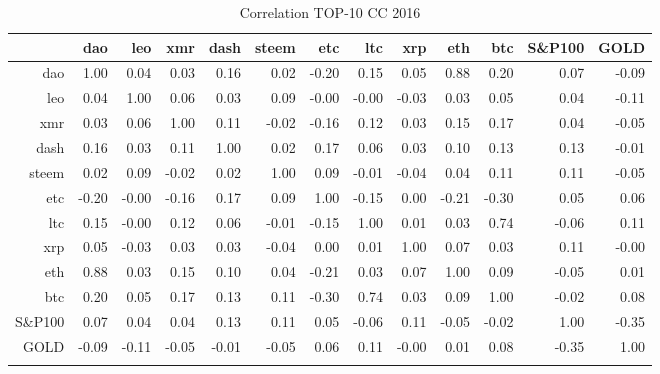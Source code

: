 \begin{table}[ht]
\centering
\begin{tabular}{rrrrrrrrrrrrr}
  \hline
 & dao & leo & xmr & dash & steem & etc & ltc & xrp & eth & btc & S\&P100 & GOLD \\ 
  \hline
dao & 1.00 & 0.04 & 0.03 & 0.16 & 0.02 & -0.20 & 0.15 & 0.05 & 0.88 & 0.20 & 0.07 & -0.09 \\ 
  leo & 0.04 & 1.00 & 0.06 & 0.03 & 0.09 & -0.00 & -0.00 & -0.03 & 0.03 & 0.05 & 0.04 & -0.11 \\ 
  xmr & 0.03 & 0.06 & 1.00 & 0.11 & -0.02 & -0.16 & 0.12 & 0.03 & 0.15 & 0.17 & 0.04 & -0.05 \\ 
  dash & 0.16 & 0.03 & 0.11 & 1.00 & 0.02 & 0.17 & 0.06 & 0.03 & 0.10 & 0.13 & 0.13 & -0.01 \\ 
  steem & 0.02 & 0.09 & -0.02 & 0.02 & 1.00 & 0.09 & -0.01 & -0.04 & 0.04 & 0.11 & 0.11 & -0.05 \\ 
  etc & -0.20 & -0.00 & -0.16 & 0.17 & 0.09 & 1.00 & -0.15 & 0.00 & -0.21 & -0.30 & 0.05 & 0.06 \\ 
  ltc & 0.15 & -0.00 & 0.12 & 0.06 & -0.01 & -0.15 & 1.00 & 0.01 & 0.03 & 0.74 & -0.06 & 0.11 \\ 
  xrp & 0.05 & -0.03 & 0.03 & 0.03 & -0.04 & 0.00 & 0.01 & 1.00 & 0.07 & 0.03 & 0.11 & -0.00 \\ 
  eth & 0.88 & 0.03 & 0.15 & 0.10 & 0.04 & -0.21 & 0.03 & 0.07 & 1.00 & 0.09 & -0.05 & 0.01 \\ 
  btc & 0.20 & 0.05 & 0.17 & 0.13 & 0.11 & -0.30 & 0.74 & 0.03 & 0.09 & 1.00 & -0.02 & 0.08 \\ 
  S\&P100 & 0.07 & 0.04 & 0.04 & 0.13 & 0.11 & 0.05 & -0.06 & 0.11 & -0.05 & -0.02 & 1.00 & -0.35 \\ 
  GOLD & -0.09 & -0.11 & -0.05 & -0.01 & -0.05 & 0.06 & 0.11 & -0.00 & 0.01 & 0.08 & -0.35 & 1.00 \\ 
   \hline
      \caption{Correlation TOP-10 CC 2016}
\end{tabular}
\end{table}